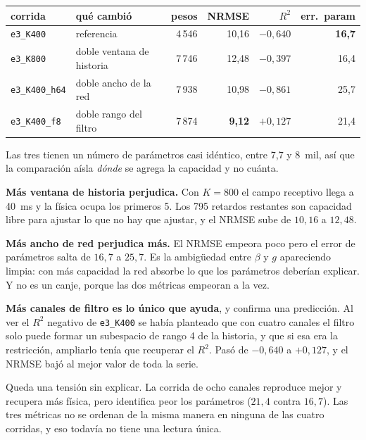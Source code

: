 \documentclass[11pt,a4paper]{article}
\begin{document}
\begin{center}
\small
\begin{tabular}{llrrrr}
\toprule
\textbf{corrida} & \textbf{qué cambió} & \textbf{pesos} &
\textbf{NRMSE} & \textbf{$R^2$} & \textbf{err.\ param} \\
\midrule
\texttt{e3\_K400}     & referencia                  & 4\,546 & 10{,}16 & $-0{,}640$ & \textbf{16{,}7} \\
\texttt{e3\_K800}     & doble ventana de historia   & 7\,746 & 12{,}48 & $-0{,}397$ & 16{,}4 \\
\texttt{e3\_K400\_h64} & doble ancho de la red      & 7\,938 & 10{,}98 & $-0{,}861$ & 25{,}7 \\
\rowcolor{suave}
\texttt{e3\_K400\_f8}  & doble rango del filtro     & 7\,874 & \textbf{9{,}12} & $+0{,}127$ & 21{,}4 \\
\bottomrule
\end{tabular}
\end{center}

Las tres tienen un número de parámetros casi idéntico, entre 7{,}7 y 8~mil, así
que la comparación aísla \emph{dónde} se agrega la capacidad y no cuánta.

\smallskip\par\textbf{Más ventana de historia perjudica.} Con $K = 800$ el campo
receptivo llega a 40~ms y la física ocupa los primeros 5. Los 795 retardos
restantes son capacidad libre para ajustar lo que no hay que ajustar, y el
NRMSE sube de $10{,}16$ a $12{,}48$.

\smallskip\par\textbf{Más ancho de red perjudica más.} El NRMSE empeora poco pero
el error de parámetros salta de $16{,}7$ a $25{,}7$. Es la ambigüedad entre
$\beta$ y $g$ apareciendo limpia: con más capacidad la red absorbe lo que los
parámetros deberían explicar. Y no es un canje, porque las dos métricas
empeoran a la vez.

\smallskip\par\textbf{Más canales de filtro es lo único que ayuda}, y confirma una
predicción. Al ver el $R^2$ negativo de \texttt{e3\_K400} se había planteado
que con cuatro canales el filtro solo puede formar un subespacio de rango 4 de
la historia, y que si esa era la restricción, ampliarlo tenía que recuperar el
$R^2$. Pasó de $-0{,}640$ a $+0{,}127$, y el NRMSE bajó al mejor valor de toda
la serie.

Queda una tensión sin explicar. La corrida de ocho canales reproduce mejor y
recupera más física, pero identifica peor los parámetros ($21{,}4$ contra
$16{,}7$). Las tres métricas no se ordenan de la misma manera en ninguna de las
cuatro corridas, y eso todavía no tiene una lectura única.
\end{document}
